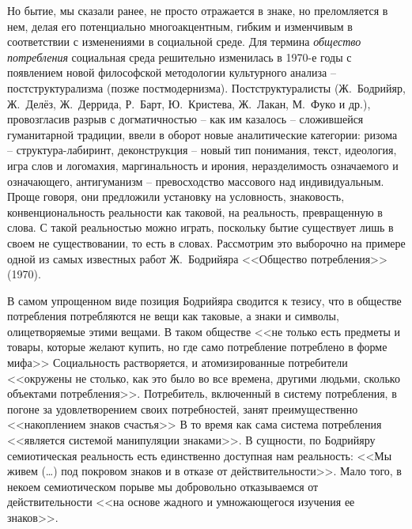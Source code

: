 Но бытие, мы сказали ранее, не просто отражается в знаке, но преломляется в
нем, делая его потенциально многоакцентным, гибким и изменчивым в соответствии
с изменениями в социальной среде. Для термина \emph{общество потребления}
социальная среда решительно изменилась в 1970-е годы с появлением новой философской
методологии культурного анализа -- постструктурализма (позже постмодернизма).
Постструктуралисты (Ж.~Бодрийяр, Ж.~Делёз, Ж.~Деррида, Р.~Барт, Ю.~Кристева, Ж.~Лакан,
М.~Фуко и др.), провозгласив разрыв с догматичностью -- как им казалось --
сложившейся гуманитарной традиции, ввели в оборот новые аналитические категории:
ризома -- структура-лабиринт, деконструкция -- новый тип понимания, текст,
идеология, игра слов и логомахия, маргинальность и ирония, неразделимость означаемого
и означающего, антигуманизм -- превосходство массового над индивидуальным.\autocite{ilyin1996}
Проще говоря, они предложили установку на условность, знаковость, конвенциональность
реальности как таковой, на реальность, превращенную в слова. С такой реальностью
можно играть, поскольку бытие существует лишь в своем не существовании,
то есть в словах. Рассмотрим это выборочно на примере одной из самых известных работ
Ж.~Бодрийяра <<Общество потребления>> (1970).

В самом упрощенном виде позиция Бодрийяра сводится к тезису, что в обществе
потребления потребляются не вещи как таковые, а знаки и символы, олицетворяемые
этими вещами. В таком обществе <<не только есть предметы и товары, которые желают
купить, но где само потребление потреблено в форме мифа>> \autocite[][3]{bodriyar_society}
Социальность растворяется, и атомизированные потребители <<окружены не столько,
как это было во все времена, другими людьми, сколько объектами потребления>>. \autocite[][5]{bodriyar_society}
Потребитель, включенный в систему потребления, в погоне за удовлетворением своих
потребностей, занят преимущественно <<накоплением знаков счастья>> \autocite[][12]{bodriyar_society}
В то время как сама система потребления <<является системой манипуляции знаками>>.
\autocite[][14]{bodriyar_society} В сущности, по Бодрийяру семиотическая реальность есть единственно
доступная нам реальность: <<Мы живем (\ldots) под покровом знаков и в отказе от
действительности>>. \autocite[][15]{bodriyar_society} Мало того, в некоем семиотическом порыве мы
добровольно отказываемся от действительности <<на основе жадного и умножающегося изучения ее
знаков>>. \autocite[][16]{bodriyar_society}

